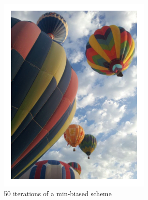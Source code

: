 \begin{figure}[ht]
\begin{minipage}[b]{0.45\linewidth}
	\includegraphics[width=\textwidth]{figures/cleaned_balloons.pdf}
	\caption*{50 iterations of a min-biased scheme}
	\end{minipage}
	\label{fig:minbias_color}
\end{figure}

